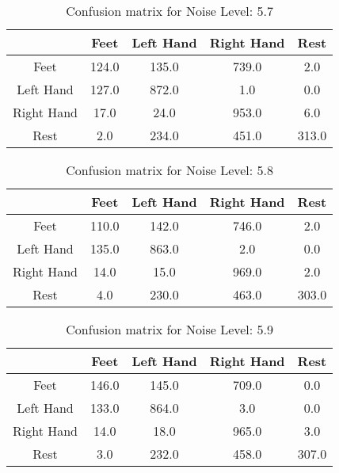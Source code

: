 \begin{table}[!htbp]
    \centering
    \begin{tabular}{|c||c|c|c|c|}
        \hline
		 & Feet & Left Hand & Right Hand & Rest \\
        \hline
        \hline
        Feet & 124.0 & 135.0 & 739.0 & 2.0 \\
        \hline
        Left Hand & 127.0 & 872.0 & 1.0 & 0.0 \\
        \hline
        Right Hand & 17.0 & 24.0 & 953.0 & 6.0 \\
        \hline
        Rest & 2.0 & 234.0 & 451.0 & 313.0 \\
        \hline
    \end{tabular}
    \caption{Confusion matrix for Noise Level: 5.7}
\end{table}

\begin{table}[!htbp]
    \centering
    \begin{tabular}{|c||c|c|c|c|}
        \hline
		 & Feet & Left Hand & Right Hand & Rest \\
        \hline
        \hline
        Feet & 110.0 & 142.0 & 746.0 & 2.0 \\
        \hline
        Left Hand & 135.0 & 863.0 & 2.0 & 0.0 \\
        \hline
        Right Hand & 14.0 & 15.0 & 969.0 & 2.0 \\
        \hline
        Rest & 4.0 & 230.0 & 463.0 & 303.0 \\
        \hline
    \end{tabular}
    \caption{Confusion matrix for Noise Level: 5.8}
\end{table}

\begin{table}[!htbp]
    \centering
    \begin{tabular}{|c||c|c|c|c|}
        \hline
		 & Feet & Left Hand & Right Hand & Rest \\
        \hline
        \hline
        Feet & 146.0 & 145.0 & 709.0 & 0.0 \\
        \hline
        Left Hand & 133.0 & 864.0 & 3.0 & 0.0 \\
        \hline
        Right Hand & 14.0 & 18.0 & 965.0 & 3.0 \\
        \hline
        Rest & 3.0 & 232.0 & 458.0 & 307.0 \\
        \hline
    \end{tabular}
    \caption{Confusion matrix for Noise Level: 5.9}
\end{table}

